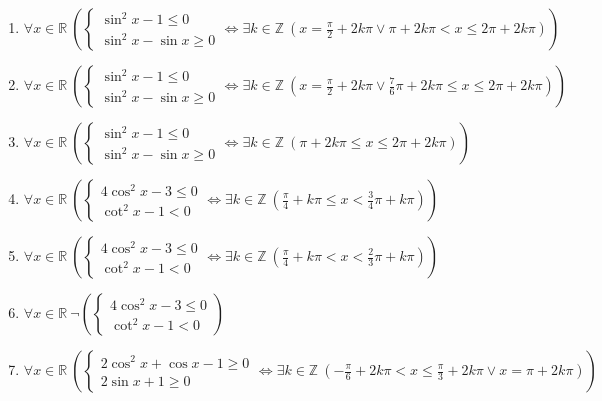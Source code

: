 \documentclass[11pt,a4paper]{article}
\begin{document}
\begin{enumerate}
\item $\displaystyle \forall x \in \mathbb{R}\ \left( \begin{cases} \sin^{2} x - 1 \le 0 \\ \sin^{2} x - \sin x \ge 0 \end{cases} \iff \exists k \in \mathbb{Z}\ \left( x = \frac{\pi}{2} + 2k\pi \lor \pi + 2k\pi < x \le 2\pi + 2k\pi \right) \right)$
\item $\displaystyle \forall x \in \mathbb{R}\ \left( \begin{cases} \sin^{2} x - 1 \le 0 \\ \sin^{2} x - \sin x \ge 0 \end{cases} \iff \exists k \in \mathbb{Z}\ \left( x = \frac{\pi}{2} + 2k\pi \lor \frac{7}{6}\pi + 2k\pi \le x \le 2\pi + 2k\pi \right) \right)$
\item $\displaystyle \forall x \in \mathbb{R}\ \left( \begin{cases} \sin^{2} x - 1 \le 0 \\ \sin^{2} x - \sin x \ge 0 \end{cases} \iff \exists k \in \mathbb{Z}\ \left( \pi + 2k\pi \le x \le 2\pi + 2k\pi \right) \right)$
\item $\displaystyle \forall x \in \mathbb{R}\ \left( \begin{cases} 4\cos^{2} x - 3 \le 0 \\ \cot^{2} x - 1 < 0 \end{cases} \iff \exists k \in \mathbb{Z}\ \left( \frac{\pi}{4} + k\pi \le x < \frac{3}{4}\pi + k\pi \right) \right)$
\item $\displaystyle \forall x \in \mathbb{R}\ \left( \begin{cases} 4\cos^{2} x - 3 \le 0 \\ \cot^{2} x - 1 < 0 \end{cases} \iff \exists k \in \mathbb{Z}\ \left( \frac{\pi}{4} + k\pi < x < \frac{2}{3}\pi + k\pi \right) \right)$
\item $\displaystyle \forall x \in \mathbb{R}\ \lnot \left( \begin{cases} 4\cos^{2} x - 3 \le 0 \\ \cot^{2} x - 1 < 0 \end{cases} \right)$
\item $\displaystyle \forall x \in \mathbb{R}\ \left( \begin{cases} 2\cos^{2} x + \cos x - 1 \ge 0 \\ 2\sin x + 1 \ge 0 \end{cases} \iff \exists k \in \mathbb{Z}\ \left( -\frac{\pi}{6} + 2k\pi < x \le \frac{\pi}{3} + 2k\pi \lor x = \pi + 2k\pi \right) \right)$

\end{enumerate}
\end{document}
